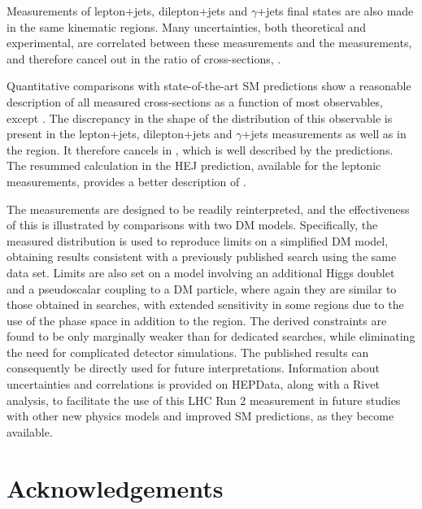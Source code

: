 \documentclass[atlasdraft=false, cernpreprint, UKenglish, texmf, orcidlogo]{atlasdoc}
\begin{document}
Measurements of lepton+jets, dilepton+jets and $\gamma$+jets final states are also made in the same kinematic regions.
Many uncertainties, both theoretical and experimental, are correlated between these measurements and the \ptmiss measurements,
and therefore cancel out in the ratio of cross-sections, \rmiss.
 
Quantitative comparisons with state-of-the-art SM predictions show a reasonable description of all measured cross-sections as a function of
most observables, except \mjj. The discrepancy in the shape of the distribution of this observable is present in the lepton+jets, dilepton+jets and
$\gamma$+jets measurements as well
as in the \ptmiss region. It therefore cancels in \rmiss, which is well described by the predictions.
The resummed calculation in the HEJ prediction,
available for the leptonic measurements, provides a better description of \mjj.
 
The measurements are designed to be readily reinterpreted, and the effectiveness of this is illustrated by comparisons with two DM models.
Specifically, the measured \rmiss distribution is used to reproduce limits on a simplified DM model, obtaining results consistent
with a previously published search using the same data set.
Limits are also set on a model involving an additional Higgs doublet and a pseudoscalar coupling to a
DM particle, where again they are similar to those obtained in searches, with extended sensitivity in some regions due to the use
of the \vbf phase space in addition to the \onejet region.
The derived constraints are found to be only marginally weaker than for dedicated searches, while eliminating the need for
complicated detector simulations. The published results can consequently be directly used for future interpretations.
Information about uncertainties and correlations is provided on HEPData,
along with
a Rivet analysis, to facilitate the use of this LHC Run 2 measurement in future studies with other new physics models and
improved SM predictions, as they become available.
 
 
 


 

\section*{Acknowledgements}
 
\end{document}
